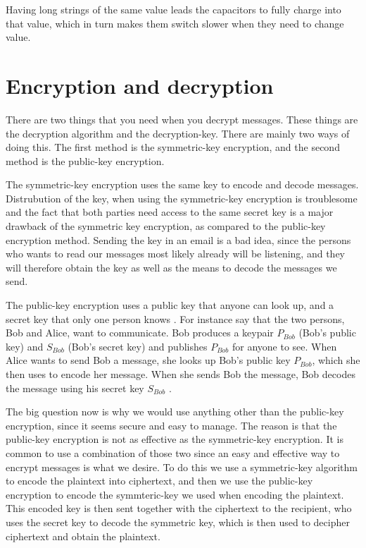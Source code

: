 Having long strings of the same value leads the capacitors to fully charge into 
that value, which in turn makes them switch slower when they need to change 
value. 

\section{Encryption and decryption}
There are two things that you need when you decrypt messages. These things 
are the decryption algorithm and the decryption-key. There are mainly two ways 
of doing this. The first method is the symmetric-key encryption, and the second 
method is the public-key encryption.

The symmetric-key encryption uses the same key to encode and decode messages. 
Distrubution of the key, when using the symmetric-key encryption is troublesome 
and the fact that both parties need access to the same secret key is a major 
drawback of the symmetric key encryption, as compared to the public-key 
encryption method. Sending the key in an email is a bad idea, since the persons 
who wants to read our messages  most likely already will be listening, and they 
will therefore obtain the key as well as the means to decode the messages we 
send.

The public-key encryption uses a public key that anyone can look up, and a 
secret key that only one person knows \citep[pp. 25--32]{Simmons:1992}.
For instance say that the two persons, Bob and Alice, want to communicate. 
Bob produces a keypair \(P_{Bob}\) (Bob’s public key) and \(S_{Bob}\) 
(Bob’s secret key) and publishes \(P_{Bob}\) for anyone to see. When Alice wants 
to send Bob a message, she looks up Bob’s public key \(P_{Bob}\), which she then 
uses to encode her message. When she sends Bob the message, Bob decodes the 
message using his secret key \(S_{Bob}\) \citep{Schneier:2003}.

The big question now is why we would use anything other than the public-key
encryption, since it seems secure and easy to manage. The reason is that the 
public-key encryption is not as effective as the symmetric-key encryption. 
It is common to use a combination of those two since an easy and effective way 
to encrypt messages is what we desire. To do this we use a symmetric-key 
algorithm to encode the plaintext into ciphertext, and then we use the 
public-key encryption to encode the symmteric-key we used when encoding the 
plaintext. This encoded key is then sent together with the ciphertext to the 
recipient, who uses the secret key to decode the symmetric key, which is then used to decipher ciphertext and obtain the plaintext.

